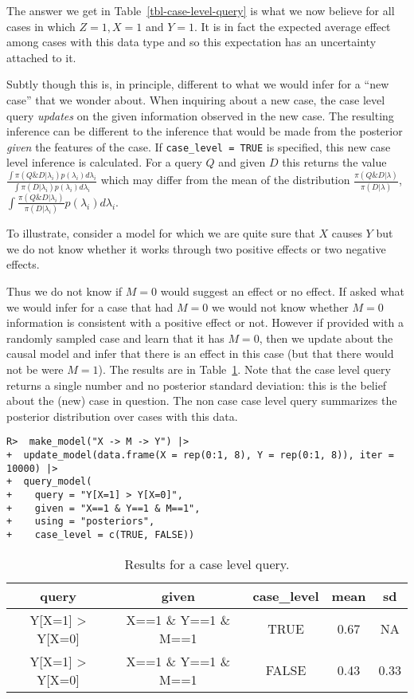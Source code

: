\documentclass[
  11pt,
  article]{jss}
\begin{document}
The answer we get in Table~\ref{tbl-case-level-query} is what we now
believe for all cases in which \(Z=1, X=1\) and \(Y=1\). It is in fact
the expected average effect among cases with this data type and so this
expectation has an uncertainty attached to it.

Subtly though this is, in principle, different to what we would infer
for a ``new case'' that we wonder about. When inquiring about a new
case, the case level query \emph{updates} on the given information
observed in the new case. The resulting inference can be different to
the inference that would be made from the posterior \emph{given} the
features of the case. If \texttt{case\_level\ =\ TRUE} is specified,
this new case level inference is calculated. For a query \(Q\) and given
\(D\) this returns the value
\(\frac{\int\pi(Q \& D | \lambda_i)p(\lambda_i)d\lambda_i}{\int\pi(D | \lambda_i)p(\lambda_i)d\lambda_i}\)
which may differ from the mean of the distribution
\(\frac{\pi(Q \& D | \lambda)}{\pi(D | \lambda)}\),
\(\int \frac{\pi(Q \& D | \lambda_i)}{\pi(D | \lambda_i)} p(\lambda_i)d\lambda_i\).

To illustrate, consider a model for which we are quite sure that \(X\)
causes \(Y\) but we do not know whether it works through two positive
effects or two negative effects.

Thus we do not know if \(M=0\) would suggest an effect or no effect. If
asked what we would infer for a case that had \(M=0\) we would not know
whether \(M=0\) information is consistent with a positive effect or not.
However if provided with a randomly sampled case and learn that it has
\(M=0\), then we update about the causal model and infer that there is
an effect in this case (but that there would not be were \(M=1\)). The
results are in Table~\ref{tbl-case-level}. Note that the case level
query returns a single number and no posterior standard deviation: this
is the belief about the (new) case in question. The non case case level
query summarizes the posterior distribution over cases with this data.

\begin{verbatim}
R>  make_model("X -> M -> Y") |>
+  update_model(data.frame(X = rep(0:1, 8), Y = rep(0:1, 8)), iter = 10000) |> 
+  query_model(
+    query = "Y[X=1] > Y[X=0]",
+    given = "X==1 & Y==1 & M==1",
+    using = "posteriors",
+    case_level = c(TRUE, FALSE))
\end{verbatim}

\hypertarget{tbl-case-level}{}
\begin{longtable}{ccccc}
\caption{\label{tbl-case-level}Results for a case level query. }\tabularnewline

\toprule
query & given & case\_level & mean & sd\\
\midrule
Y[X=1] > Y[X=0] & X==1 \& Y==1 \& M==1 & TRUE & 0.67 & NA\\
Y[X=1] > Y[X=0] & X==1 \& Y==1 \& M==1 & FALSE & 0.43 & 0.33\\
\bottomrule
\end{longtable}
\end{document}
